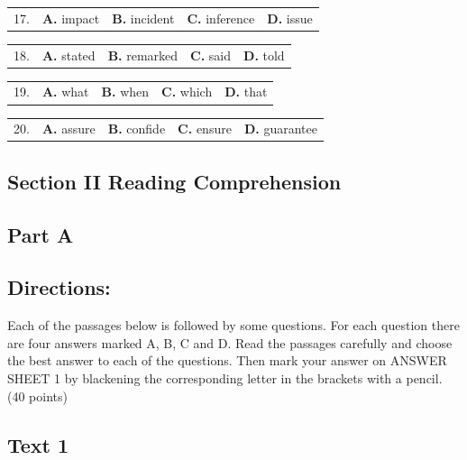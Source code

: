 \documentclass[UTF8,11pt]{ctexart}
\begin{document}
\noindent\begin{tabularx}{\linewidth}{@{}lXXXX@{}}17. & \textbf{A.} impact & \textbf{B.} incident & \textbf{C.} inference & \textbf{D.} issue\\\end{tabularx}\par

\noindent\begin{tabularx}{\linewidth}{@{}lXXXX@{}}18. & \textbf{A.} stated & \textbf{B.} remarked & \textbf{C.} said & \textbf{D.} told\\\end{tabularx}\par

\noindent\begin{tabularx}{\linewidth}{@{}lXXXX@{}}19. & \textbf{A.} what & \textbf{B.} when & \textbf{C.} which & \textbf{D.} that\\\end{tabularx}\par

\noindent\begin{tabularx}{\linewidth}{@{}lXXXX@{}}20. & \textbf{A.} assure & \textbf{B.} confide & \textbf{C.} ensure & \textbf{D.} guarantee\\\end{tabularx}\par

\subsection*{\textbf{Section II Reading Comprehension}}


\subsection*{\textbf{Part A}}


\subsection*{\textbf{Directions:}}


Each of the passages below is followed by some questions. For each question there are four answers marked A, B, C and D. Read the passages carefully and choose the best answer to each of the questions. Then mark your answer on ANSWER SHEET 1 by blackening the corresponding letter in the brackets with a pencil. (40 points)


\subsection*{\textbf{Text 1}}
\end{document}
